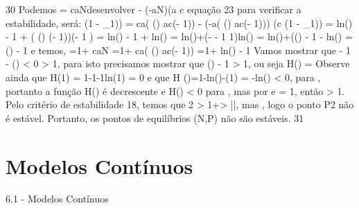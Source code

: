 {{{{{{{{{{30 
Podemos  = caN\lambda desenvolver - (-aN)(a c 
equação 23 para verificar a estabilidade,  será: (1 - \lambda_{1})) 
 = 
ca( \lambdaln(\lambda) 
ac(\lambda - 1)) 
\lambda - 
(-a( \lambdaln(\lambda) 
ac(\lambda - 1))) (c 
(1 - \lambda_{1}))  = \lambda ln(\lambda) 
- 1 + 
( \lambdaln(\lambda) 
(\lambda - 1))(\lambda - 1 
\lambda 
) 
 = \lambda ln(\lambda) 
- 1 + ln(\lambda)  = ln(\lambda)+(\lambda \lambda - - 1 
1)ln(\lambda) 
 = ln(\lambda)+(\lambdaln(\lambda) \lambda - 1 
- ln(\lambda) 
 = \lambdaln(\lambda) \lambda - 1 
e  temos,  =1+ caN\lambda 
{} =1+ 
ca( \lambdaln(\lambda) 
ac(\lambda - 1)) 
 =1+ \lambda ln(\lambda) - 1 
\lambda 
Vamos mostrar que \lambda - 1 - \lambdaln(\lambda) < 0 
 > 1, para isto precisamos mostrar que \lambdaln(\lambda) 
\lambda - 1 > 1, ou seja H(\lambda) = Observe ainda que H(1) = 1-1-1ln(1) = 0 e que H (\lambda)=1-ln(\lambda)-\lambda(1\lambda) 
= -ln(\lambda) < 0, 
para \lambda {}, portanto a função H(\lambda) é decrescente e H(\lambda) < 0 para \lambda {}, mas por  e  \lambda = 1, então \lambda > 1. 
Pelo critério de estabilidade 18, temos que 2 > 1+\gamma  > |\beta|, mas \lambda {}, logo o ponto P2 não é estável. 
Portanto, os pontos de equilíbrios (N,P) não são estáveis. 
31 

\chapter{Modelos Contínuos}

6.1 - Modelos Contínuos 

}}}}}}}}}}
